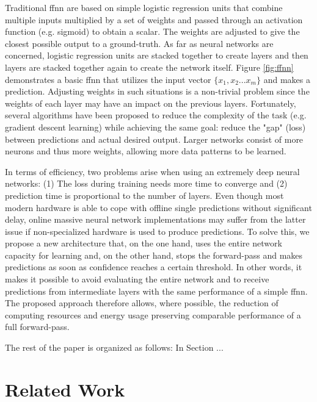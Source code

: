 \documentclass[conference]{IEEEtran}
\begin{document}
Traditional \gls{ffnn} are based on simple logistic regression units that combine multiple inputs multiplied by a set of weights and passed through an activation function (e.g. sigmoid) to obtain a scalar. The weights are adjusted to give the closest possible output to a ground-truth. As far as neural networks are concerned, logistic regression units are stacked together to create layers and then layers are stacked together again to create the network itself. Figure \ref{fig:ffnn} demonstrates a basic \gls{ffnn} that utilizes the input vector $\lbrace x_{1}, x_{2} ... x_{m} \rbrace$ and makes a prediction. Adjusting weights in such situations is a non-trivial problem since the weights of each layer may have an impact on the previous layers. Fortunately, several algorithms have been proposed to reduce the complexity of the task (e.g. gradient descent learning) while achieving the same goal: reduce the "gap" (loss) between predictions and actual desired output. Larger networks consist of more neurons and thus more weights, allowing more data patterns to be learned.

In terms of efficiency, two problems arise when using an extremely deep neural networks: (1) The loss during training needs more time to converge and (2) prediction time is proportional to the number of layers. Even though most modern hardware is able to cope with offline single predictions without significant delay, online massive neural network implementations may suffer from the latter issue if non-specialized hardware is used to produce predictions.
To solve this, we propose a new architecture that, on the one hand, uses the entire network capacity for learning and, on the other hand, stops the forward-pass and makes predictions as soon as confidence reaches a certain threshold. In other words, it makes it possible to avoid evaluating the entire network and to receive predictions from intermediate layers with the same performance of a simple \gls{ffnn}. The proposed approach therefore allows, where possible, the reduction of computing resources and energy usage preserving comparable performance of a full forward-pass.


The rest of the paper is organized as follows: In Section ...

\section{Related Work}
\end{document}
